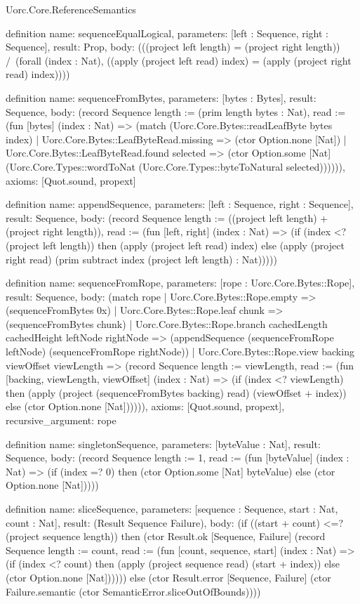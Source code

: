 \begin{lexlean}{Uorc.Core.ReferenceSemantics}
\begin{semanticmodule}
definition{
  name: sequenceEqualLogical,
  parameters: [left : Sequence, right : Sequence],
  result: Prop,
  body: (((project left length) = (project right length)) /\ (forall (index : Nat), ((apply (project left read) index) = (apply (project right read) index))))
}

definition{
  name: sequenceFromBytes,
  parameters: [bytes : Bytes],
  result: Sequence,
  body: (record Sequence {length := (prim length bytes : Nat), read := (fun [bytes] (index : Nat) => (match (Uorc.Core.Bytes::readLeafByte bytes index)
    | Uorc.Core.Bytes::LeafByteRead.missing => (ctor Option.none [Nat])
    | Uorc.Core.Bytes::LeafByteRead.found selected => (ctor Option.some [Nat] (Uorc.Core.Types::wordToNat (Uorc.Core.Types::byteToNatural selected)))))}),
  axioms: [Quot.sound, propext]
}

definition{
  name: appendSequence,
  parameters: [left : Sequence, right : Sequence],
  result: Sequence,
  body: (record Sequence {length := ((project left length) + (project right length)), read := (fun [left, right] (index : Nat) => (if (index <? (project left length)) then (apply (project left read) index) else (apply (project right read) (prim subtract index (project left length) : Nat))))})
}

definition{
  name: sequenceFromRope,
  parameters: [rope : Uorc.Core.Bytes::Rope],
  result: Sequence,
  body: (match rope
    | Uorc.Core.Bytes::Rope.empty => (sequenceFromBytes 0x)
    | Uorc.Core.Bytes::Rope.leaf chunk => (sequenceFromBytes chunk)
    | Uorc.Core.Bytes::Rope.branch cachedLength cachedHeight leftNode rightNode => (appendSequence (sequenceFromRope leftNode) (sequenceFromRope rightNode))
    | Uorc.Core.Bytes::Rope.view backing viewOffset viewLength => (record Sequence {length := viewLength, read := (fun [backing, viewLength, viewOffset] (index : Nat) => (if (index <? viewLength) then (apply (project (sequenceFromBytes backing) read) (viewOffset + index)) else (ctor Option.none [Nat])))})),
  axioms: [Quot.sound, propext],
  recursive_argument: rope
}

definition{
  name: singletonSequence,
  parameters: [byteValue : Nat],
  result: Sequence,
  body: (record Sequence {length := 1, read := (fun [byteValue] (index : Nat) => (if (index =? 0) then (ctor Option.some [Nat] byteValue) else (ctor Option.none [Nat])))})
}

definition{
  name: sliceSequence,
  parameters: [sequence : Sequence, start : Nat, count : Nat],
  result: (Result Sequence Failure),
  body: (if ((start + count) <=? (project sequence length)) then (ctor Result.ok [Sequence, Failure] (record Sequence {length := count, read := (fun [count, sequence, start] (index : Nat) => (if (index <? count) then (apply (project sequence read) (start + index)) else (ctor Option.none [Nat])))})) else (ctor Result.error [Sequence, Failure] (ctor Failure.semantic (ctor SemanticError.sliceOutOfBounds))))
}


\end{semanticmodule}
\end{lexlean}
